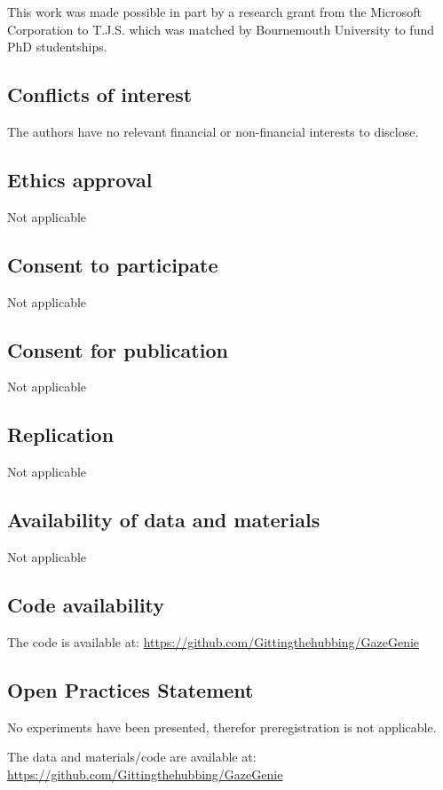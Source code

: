 \documentclass[twocolumn]{article}
\begin{document}
This work was made possible in part by a research grant from the Microsoft Corporation to T.J.S. which was matched by Bournemouth University to fund PhD studentships.

\subsection{Conflicts of interest}
The authors have no relevant financial or non-financial interests to disclose.

\subsection{Ethics approval}
Not applicable

\subsection{Consent to participate}
Not applicable

\subsection{Consent for publication}
Not applicable

\subsection{Replication}

Not applicable

\subsection{Availability of data and materials }

Not applicable

\subsection{Code availability}

The code is available at: \url{https://github.com/Gittingthehubbing/GazeGenie}

\subsection{Open Practices Statement}

No experiments have been presented, therefor preregistration is not applicable.

The data and materials/code are available at: \url{https://github.com/Gittingthehubbing/GazeGenie}
\end{document}
